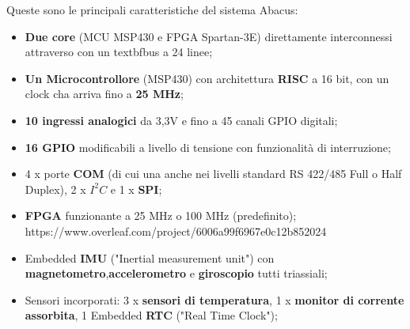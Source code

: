 \documentclass[LaM,binding=0.6cm]{../sapthesis}
\begin{document}
Queste sono le principali caratteristiche del sistema Abacus:
\begin{itemize}
    \item \textbf{Due core} (MCU MSP430 e FPGA Spartan-3E) direttamente interconnessi attraverso con un textbf{bus a 24 linee};
    
    \item \textbf{Un Microcontrollore} (MSP430) con architettura \textbf{RISC} a 16 bit, con un clock cha arriva fino a \textbf{25 MHz};
    
    \item \textbf{10 ingressi analogici} da 3,3V e fino a 45 canali GPIO digitali;
    
    \item \textbf{16 GPIO} modificabili a livello di tensione con funzionalità di interruzione;
    
    \item 4 x porte \textbf{COM} (di cui una anche nei livelli standard RS 422/485 Full o Half Duplex), 2 x \textbf{$I^2C$} e 1 x \textbf{SPI};
    
    \item \textbf{FPGA} funzionante a 25 MHz o 100 MHz (predefinito);
    https://www.overleaf.com/project/6006a99f6967e0c12b852024
    \item Embedded \textbf{IMU} ("Inertial measurement unit") con \textbf{magnetometro},\newline \textbf{accelerometro} e \textbf{giroscopio} tutti triassiali;
    
    \item Sensori incorporati: 3 x \textbf{sensori di temperatura}, 1 x \textbf{monitor di corrente assorbita}, 1 Embedded \textbf{RTC} ("Real Time Clock");
\end{itemize}
\end{document}
